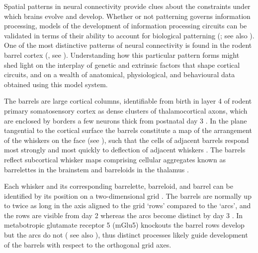 \documentclass[a4paper,11pt]{article}
\begin{document}
Spatial patterns in neural connectivity provide clues about the constraints
under which brains evolve and develop. Whether or not patterning governs
information processing, models of the development of information processing
circuits can be validated in terms of their ability to account for biological
patterning (\citealp{purves_iterated_1992}; see also
\citealp{wilson_what_2015,bednar_cortical_2016}). One of the most distinctive patterns of
neural connectivity is found in the rodent barrel cortex
(\citealp{woolsey_pattern_1948,woolsey_structural_1970,welker_structure_1974}, see
\citealp{fox_barrel_2008}). Understanding how this particular pattern forms might shed
light on the interplay of genetic and extrinsic factors that shape cortical
circuits, and on a wealth of anatomical, physiological, and behavioural data
obtained using this model system.

The barrels are large cortical columns, identifiable from birth in layer 4 of
rodent primary somatosensory cortex as dense clusters of thalamocortical
axons, which are enclosed by borders a few neurons thick from postnatal day 3
\citep{erzurumlu_development_2012}. In the plane tangential to the cortical surface the
barrels constitute a map of the arrangement of the whiskers on the
face (see \citealp{yamakado_subdivision_1979}), such
that the cells of adjacent barrels respond most strongly and most quickly to
deflection of adjacent whiskers \citep{armstrong-james_flow_1992}. The barrels
reflect subcortical whisker maps comprising cellular aggregates known as
barrelettes in the brainstem and barreloids in the thalamus
\citep{killackey_pattern_1980}.

Each whisker and its corresponding barrelette, barreloid, and barrel can be
identified by its position on a two-dimensional grid
\citep{zucker_coding_1969,killackey_pattern_1980,van_der_loos_barreloids_1976,haidarliu_size_2001}. The barrels are normally up to
twice as long in the axis aligned to the grid ‘rows’ compared to the ‘arcs’,
and the rows are visible from day 2 \citep{rebsam_refinement_2002} whereas the arcs become
distinct by day 3 \citep{erzurumlu_development_2012,rebsam_refinement_2002}. In metabotropic glutamate
receptor 5 (mGlu5) knockouts the barrel rows develop but the arcs do not
(\citealp{hannan_plc-1_2001} see also \citealp{fox_barrel_2008}), thus distinct processes
likely guide development of the barrels with respect to the orthogonal grid
axes.
\end{document}
